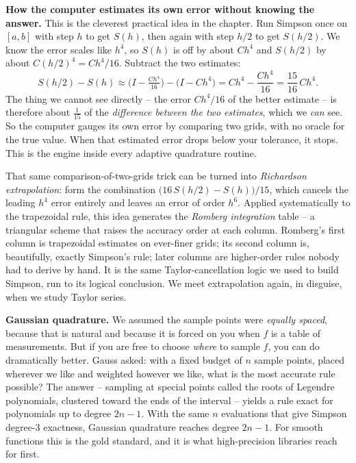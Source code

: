 \begin{whybox}
\textbf{How the computer estimates its own error without knowing the answer.} This is the cleverest practical idea in the chapter. Run Simpson once on $[a,b]$ with step $h$ to get $S(h)$, then again with step $h/2$ to get $S(h/2)$. We know the error scales like $h^4$, so $S(h)$ is off by about $C h^4$ and $S(h/2)$ by about $C(h/2)^4 = Ch^4/16$. Subtract the two estimates:
\[
S(h/2) - S(h) \approx \Big(I - \tfrac{Ch^4}{16}\Big) - \big(I - Ch^4\big) = Ch^4 - \frac{Ch^4}{16} = \frac{15}{16}\,Ch^4.
\]
The thing we cannot see directly -- the error $Ch^4/16$ of the better estimate -- is therefore about $\tfrac{1}{15}$ of the \emph{difference between the two estimates}, which we \emph{can} see. So the computer gauges its own error by comparing two grids, with no oracle for the true value. When that estimated error drops below your tolerance, it stops. This is the engine inside every adaptive quadrature routine.
\end{whybox}

\begin{connectionbox}
That same comparison-of-two-grids trick can be turned into \emph{Richardson extrapolation}: form the combination $\big(16\,S(h/2) - S(h)\big)/15$, which cancels the leading $h^4$ error entirely and leaves an error of order $h^6$. Applied systematically to the trapezoidal rule, this idea generates the \emph{Romberg integration} table -- a triangular scheme that raises the accuracy order at each column. Romberg's first column is trapezoidal estimates on ever-finer grids; its second column is, beautifully, exactly Simpson's rule; later columns are higher-order rules nobody had to derive by hand. It is the same Taylor-cancellation logic we used to build Simpson, run to its logical conclusion. We meet extrapolation again, in disguise, when we study Taylor series.
\end{connectionbox}

\textbf{Gaussian quadrature.} We assumed the sample points were \emph{equally spaced}, because that is natural and because it is forced on you when $f$ is a table of measurements. But if you are free to choose \emph{where} to sample $f$, you can do dramatically better. Gauss asked: with a fixed budget of $n$ sample points, placed wherever we like and weighted however we like, what is the most accurate rule possible? The answer -- sampling at special points called the roots of Legendre polynomials, clustered toward the ends of the interval -- yields a rule exact for polynomials up to degree $2n-1$. With the same $n$ evaluations that give Simpson degree-$3$ exactness, Gaussian quadrature reaches degree $2n-1$. For smooth functions this is the gold standard, and it is what high-precision libraries reach for first.

